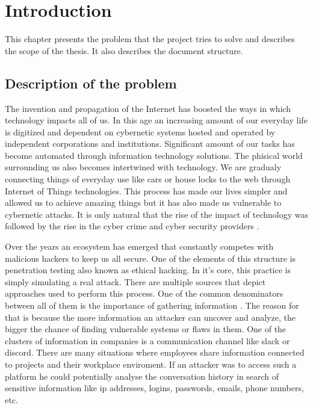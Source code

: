 \documentclass[a4paper,twoside,12pt]{book}
\newcounter{PagesWithoutNumbers}
\begin{document}
\vfill
 
 

\cleardoublepage


\pagestyle{onlyPageNumbers}
\tableofcontents

\setcounter{PagesWithoutNumbers}{\value{page}}
\mainmatter
\pagestyle{PageNumbersChapterTitles}



\chapter{Introduction}

This chapter presents the problem that the project tries to solve and describes the scope of the thesis. It also describes the document structure.

\section{Description of the problem}

The invention and propagation of the Internet has boosted the ways in which technology impacts
all of us. In this age an increasing amount of our everyday life is digitized and dependent 
on cybernetic systems hosted and operated by independent corporations and institutions. Significant
amount of our tasks has become automated through information technology solutions. The phisical world 
surrounding us also becomes intertwined with technology. We are gradualy connecting things of everyday 
use like cars or house locks to the web through Internet of Things technologies. This process has 
made our lives simpler and allowed us to achieve amazing things but it has also made us vulnerable to 
cybernetic attacks. It is only natural that the rise of the impact of technology was followed 
by the rise in the cyber crime and cyber security providers \cite{bib:articleImportanceOfCybersecurity}. 

Over the years an ecosystem has emerged that constantly competes with malicious hackers to keep us all secure.
One of the elements of this structure is penetration testing also known as ethical hacking. In it's core, 
this practice is simply simulating a real attack. There are multiple sources that depict approaches 
used to perform this process. One of the common denominators between all of them is the importance of 
gathering information \cite{bib:bookEthicalHacking}. The reason for that is because the more information an attacker can uncover and analyze, 
the bigger the chance of finding vulnerable systems or flaws in them. One of the clusters of information 
in companies is a communication channel like slack or discord. There are many situations where employees 
share information connected to projects and their workplace enviroment. If an attacker was to access such a 
platform he could potentially analyse the conversation history in search of sensitive information like ip addresses, 
logins, passwords, emails, phone numbers, etc.
\end{document}
